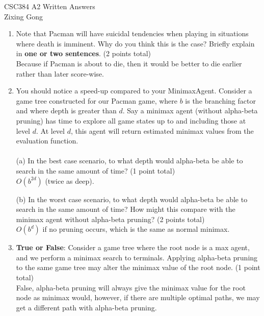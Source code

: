 \documentclass{article}
\begin{document}
\noindent CSC384 A2 Written Answers\\
Zixing Gong\\
\begin{enumerate}
	\item Note that Pacman will have suicidal tendencies when playing in situations where death is imminent. Why do you think this is the case? Briefly explain in \textbf{one or two sentences}. (2 points total)\\
	Because if Pacman is about to die, then it would be better to die earlier rather than later score-wise.\\
	
	\item You should notice a speed-up compared to your MinimaxAgent. Consider a game tree constructed	for our Pacman game, where $b$ is the branching factor and where depth is greater than $d$. Say a	minimax agent (without alpha-beta pruning) has time to explore all game states up to and including	those at level $d$. At level $d$, this agent will return estimated minimax values from the evaluation function.\\~\\
	(a) In the best case scenario, to what depth would alpha-beta be able to search in the same amount of time? (1 point total)\\
	$O(b^{2d})$ (twice as deep).
	
	(b) In the worst case scenario, to what depth would alpha-beta be able to search in the same amount of time? How might this compare with the minimax agent without alpha-beta pruning? (2 points total)\\
	$O(b^d)$ if no pruning occurs, which is the same as normal minimax.\\
	
	\item \textbf{True or False}: Consider a game tree where the root node is a max agent, and we perform a minimax	search to terminals. Applying alpha-beta pruning to the same game tree may alter the minimax value of the root node. (1 point total)\\
	False, alpha-beta pruning will always give the minimax value for the root node as minimax would, however, if there are multiple optimal paths, we may get a different path with alpha-beta pruning.\\
	

\end{enumerate}
\end{document}
